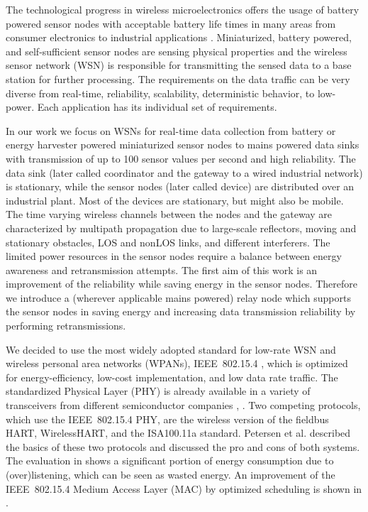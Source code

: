 \documentclass[times,10pt,twocolumn]{article}
\begin{document}
\label{section_introduction}

The technological progress in wireless microelectronics offers the usage of battery powered sensor nodes with acceptable battery life times in many areas from consumer electronics to industrial applications \cite{industrial_WSN_challenges}. Miniaturized, battery powered, and self-sufficient sensor nodes are sensing physical properties and the wireless sensor network (WSN) is responsible for transmitting the sensed data to a base station for further processing. The requirements on the data traffic can be very diverse from real-time, reliability, scalability, deterministic behavior, to low-power. Each application has its individual set of requirements.

In our work we focus on WSNs for real-time data collection from battery or energy harvester powered miniaturized sensor nodes \cite{energy_harvesting_technologies} to mains powered data sinks with transmission of up to 100 sensor values per second and high reliability. The data sink (later called coordinator and the gateway to a wired industrial network) is stationary, while the sensor nodes (later called device) are distributed over an industrial plant. Most of the devices are stationary, but might also be mobile. The time varying wireless channels between the nodes and the gateway are characterized by multipath propagation due to large-scale reflectors, moving and stationary obstacles, LOS and nonLOS links, and different interferers. The limited power resources in the sensor nodes require a balance between energy awareness and retransmission attempts. The first aim of this work is an improvement of the reliability while saving energy in the sensor nodes. Therefore we introduce a (wherever applicable mains powered) relay node which supports the sensor nodes in saving energy and increasing data transmission reliability by performing retransmissions.

We decided to use the most widely adopted standard for low-rate WSN and wireless personal area networks (WPANs), IEEE~802.15.4 \cite{IEEE_STD_802.15.4}, which is optimized for energy-efficiency, low-cost implementation, and low data rate traffic. The standardized Physical Layer (PHY) is already available in a variety of transceivers from different semiconductor companies \cite{CC2520}, \cite{MRF24J40}. Two competing protocols, which use the IEEE~802.15.4 PHY, are the wireless version of the fieldbus HART, WirelessHART, and the ISA100.11a standard. Petersen et al. \cite{wirelessHART_versus_ISA100_11a} described the basics of these two protocols and discussed the pro and cons of both systems. The evaluation in \cite{wirelessHART_energy_analysis} shows a significant portion of energy consumption due to (over)listening, which can be seen as wasted energy. An improvement of the IEEE~802.15.4 Medium Access Layer (MAC) by optimized scheduling is shown in \cite{guarantee_real_time_in_802_15_4}.
\end{document}
